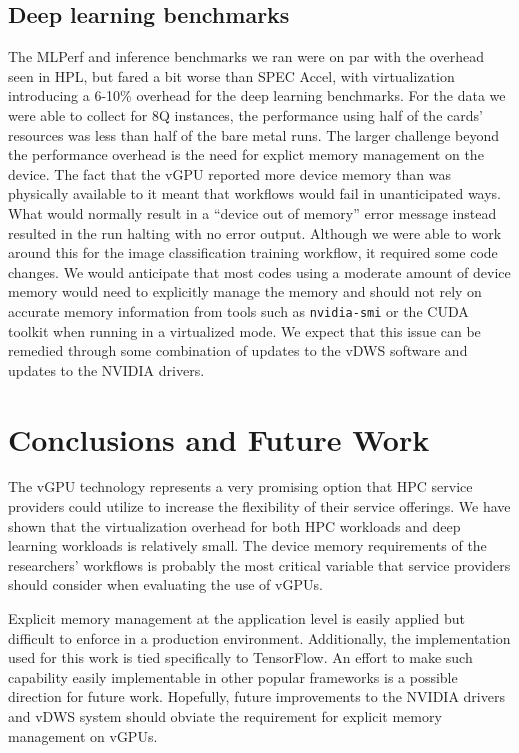 \documentclass[acmsmall, authorversion]{acmart}
\begin{document}
\subsection {Deep learning benchmarks}
The MLPerf and inference benchmarks we ran were on par with the overhead seen in HPL, but fared a bit worse than SPEC Accel, with virtualization introducing a 6-10\% overhead for the deep learning benchmarks. For the data we were able to collect for 8Q instances, the performance using half of the cards' resources was less than half of the bare metal runs. The larger challenge beyond the performance overhead is the need for explict memory management on the device. The fact that the vGPU reported more device memory than was physically available to it meant that workflows would fail in unanticipated ways. What would normally result in a ``device out of memory'' error message instead resulted in the run halting with no error output. Although we were able to work around this for the image classification training workflow, it required some code changes. We would anticipate that most codes using a moderate amount of device memory would need to explicitly manage the memory and should not rely on accurate memory information from tools such as {\tt nvidia-smi} or the CUDA toolkit when running in a virtualized mode. We expect that this issue can be remedied through some combination of updates to the vDWS software and updates to the NVIDIA drivers.

\section{Conclusions and Future Work}\label{sec:conclusion}
The vGPU technology represents a very promising option that HPC service providers could utilize to increase the flexibility of their service offerings. We have shown that the virtualization overhead for both HPC workloads and deep learning workloads is relatively small. The device memory requirements of the researchers' workflows is probably the most critical variable that service providers should consider when evaluating the use of vGPUs.

Explicit memory management at the application level is easily applied but difficult to enforce in a production environment. Additionally, the implementation used for this work is tied specifically to TensorFlow. An effort to make such capability easily implementable in other popular frameworks is a possible direction for future work. Hopefully, future improvements to the NVIDIA drivers and vDWS system should obviate the requirement for explicit memory management on vGPUs.
\end{document}
